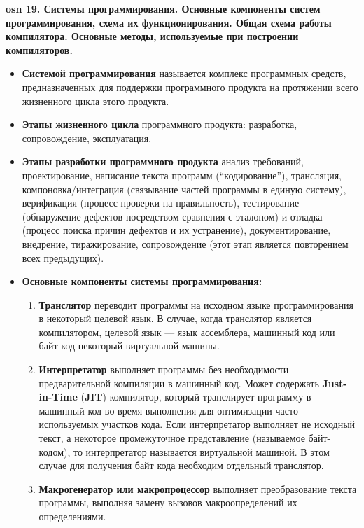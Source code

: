 \setcounter{section}{15}
\setcounter{subsection}{19}
\setcounter{equation}{0}
\textbf{\LARGE osn 19. Системы программирования. Основные компоненты систем программирования, схема их функционирования. Общая схема работы компилятора. Основные методы, используемые при построении компиляторов.}

\begin{itemize}
    \item \textbf{Системой программирования} называется комплекс программных средств, предназначенных для поддержки программного продукта на протяжении всего жизненного цикла этого продукта.
    \item \textbf{Этапы жизненного цикла} программного продукта: разработка, сопровождение, эксплуатация.
    \item \textbf{Этапы разработки программного продукта}
        анализ требований,
        проектирование,
        написание текста программ (``кодирование''),
        трансляция, компоновка/интеграция (связывание частей программы в единую систему),
        верификация (процесс проверки на правильность), тестирование (обнаружение дефектов посредством сравнения с эталоном) и отладка (процесс поиска причин дефектов и их устранение),
        документирование,
        внедрение,
        тиражирование,
        сопровождение (этот этап является повторением всех предыдущих).
    \item \textbf{Основные компоненты системы программирования:}
    \begin{enumerate}
        \item \textbf{Транслятор} переводит программы на исходном языке программирования в некоторый целевой язык.
        В случае, когда транслятор является компилятором, целевой язык --- язык ассемблера, машинный код или байт-код некоторый виртуальной машины.
        \item \textbf{Интерпретатор} выполняет программы без необходимости предварительной компиляции в машинный код.
        Может содержать \textbf{Just-in-Time} (\textbf{JIT}) компилятор, который транслирует программу в машинный код во время выполнения для оптимизации часто используемых участков кода.
        Если интерпретатор выполняет не исходный текст, а некоторое промежуточное представление (называемое байт-кодом), то интерпретатор называется виртуальной машиной.
        В этом случае для получения байт кода необходим отдельный транслятор.
        \item \textbf{Макрогенератор или макропроцессор} выполняет преобразование текста программы, выполняя замену вызовов макроопределений их определениями.

\end{enumerate}
\end{itemize}

